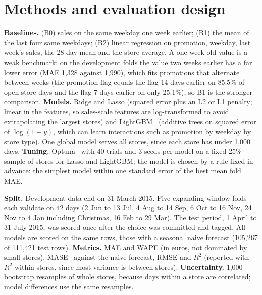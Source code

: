 \documentclass[10pt,twocolumn]{extarticle}
\begin{document}
\section{Methods and evaluation design}
\textbf{Baselines.} (B0) sales on the same weekday one week earlier; (B1) the mean of the last four same weekdays; (B2) linear regression on promotion, weekday, last week's sales, the 28-day mean and the store average. A one-week-old value is a weak benchmark: on the development folds the value two weeks earlier has a far lower error (MAE 1,328 against 1,990), which fits promotions that alternate between weeks (the promotion flag equals the flag 14 days earlier on 85.5\% of open store-days and the flag 7 days earlier on only 25.1\%), so B1 is the stronger comparison. \textbf{Models.} Ridge and Lasso (squared error plus an L2 or L1 penalty; linear in the features, so sales-scale features are log-transformed to avoid extrapolating the largest stores) and LightGBM~\cite{lgbm} (additive trees on squared error of $\log(1+y)$, which can learn interactions such as promotion by weekday by store type). One global model serves all stores, since each store has under 1,000 days. \textbf{Tuning.} Optuna~\cite{optuna} with 40 trials and 3 seeds per model on a fixed 25\% sample of stores for Lasso and LightGBM; the model is chosen by a rule fixed in advance: the simplest model within one standard error of the best mean fold MAE.

\textbf{Split.} Development data end on 31 March 2015. Five expanding-window folds each validate on 42 days (2 Jun to 13 Jul, 4 Aug to 14 Sep, 6 Oct to 16 Nov, 24 Nov to 4 Jan including Christmas, 16 Feb to 29 Mar). The test period, 1 April to 31 July 2015, was scored once after the choice was committed and tagged. All models are scored on the same rows, those with a seasonal naive forecast (105,267 of 111,421 test rows). \textbf{Metrics.} MAE and WAPE (in euros, not dominated by small stores), MASE~\cite{mase} against the naive forecast, RMSE and $R^2$ (reported with $R^2$ within stores, since most variance is between stores). \textbf{Uncertainty.} 1,000 bootstrap resamples of whole stores, because days within a store are correlated; model differences use the same resamples.
\end{document}
